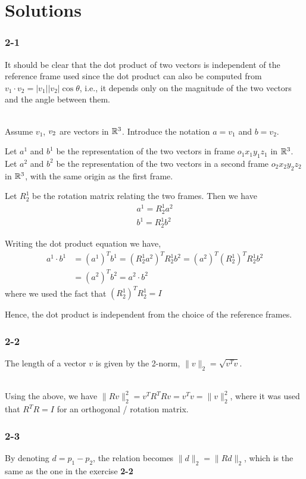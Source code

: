 \chapter[Chapter 2]{Solutions}

\subsection*{2-1}

It should be clear that the dot product of two vectors is independent of the reference frame used since the dot product can also be computed from $v_1 \cdot v_2 = |v_1| |v_2| \cos\theta$, i.e., it depends only on the magnitude of the two vectors and the angle between them.
\\~


Assume $v_1$, $v_2\space$ are vectors in $\mathbb{R}^3$. Introduce the notation $a=v_1$ and $b=v_2$.


Let $a^1$ and $b^1$ be the representation of the two vectors in frame $o_1x_1y_1z_1$ in $\mathbb{R}^3$.
Let $a^2$ and $b^2$ be the representation of the two vectors in a second frame $o_2x_2y_2z_2$ in $\mathbb{R}^3$, with the same origin as the first frame.

Let $R^1_2$ be the rotation matrix relating the two frames. Then we have 
\begin{align*} 
a^1 = R^1_2 a^2 \\ 
b^1 = R^1_2 b^2
\end{align*}

Writing the dot product equation we have, 
\begin{align*} 
a^1 \cdot b^1 &= (a^1)^T b^1 = (R^1_2 a^2)^T  R^1_2 b^2 = (a^2)^T (R^1_2)^T  R^1_2 b^2 \\
&= (a^2)^T b^2 = a^2 \cdot b^2 
\end{align*}
where we used the fact that $(R^1_2)^T  R^1_2 =I$

Hence, the dot product is independent from the choice of the reference frames.

\subsection*{2-2}

The length of a vector $v$ is given by the 2-norm, $\|v\|_2 = \sqrt{v^Tv}$.\\~

Using the above, we have $\|Rv\|^2_2=v^TR^TRv=v^Tv=\|v\|_2^2$, where it was used that $R^TR=I$ for an orthogonal / rotation matrix.

\subsection*{2-3}

By denoting $d=p_1-p_2$, the relation becomes $\|d\|_2=\|Rd\|_2$, which is the same as the one in the exercise \textbf{2-2}


